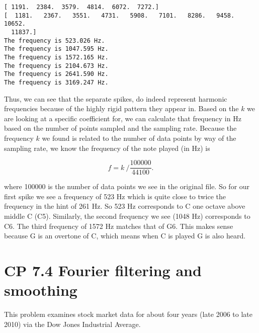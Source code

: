 \documentclass[11pt]{article}
\begin{document}
    \begin{Verbatim}[commandchars=\\\{\}]
[ 1191.  2384.  3579.  4814.  6072.  7272.]
[  1181.   2367.   3551.   4731.   5908.   7101.   8286.   9458.  10652.
  11837.]
The frequency is 523.026 Hz.
The frequency is 1047.595 Hz.
The frequency is 1572.165 Hz.
The frequency is 2104.673 Hz.
The frequency is 2641.590 Hz.
The frequency is 3169.247 Hz.

    \end{Verbatim}

    Thus, we can see that the separate spikes, do indeed represent harmonic
frequencies because of the highly rigid pattern they appear in. Based on
the \(k\) we are looking at a specific coefficient for, we can calculate
that frequency in Hz based on the number of points sampled and the
sampling rate. Because the frequency \(k\) we found is related to the
number of data points by way of the sampling rate, we know the frequency
of the note played (in Hz) is

\[ f = k\ \biggr/ \frac{100000}{44100}.\]

where 100000 is the number of data points we see in the original file.
So for our first spike we see a frequency of 523 Hz which is quite close
to twice the frequency in the hint of 261 Hz. So 523 Hz corresponds to C
one octave above middle C (C5). Similarly, the second frequency we see
(1048 Hz) corresponds to C6. The third frequency of 1572 Hz matches that
of G6. This makes sense because G is an overtone of C, which means when
C is played G is also heard.

    \section{CP 7.4 Fourier filtering and
smoothing}\label{cp-7.4-fourier-filtering-and-smoothing}

This problem examines stock market data for about four years (late 2006
to late 2010) via the Dow Jones Industrial Average.
\end{document}
